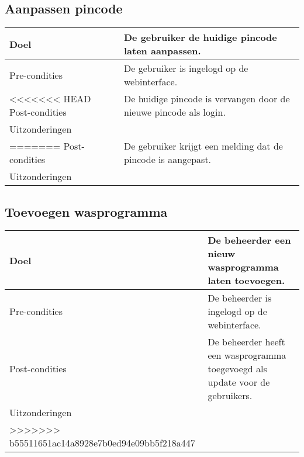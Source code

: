 \subsection{Aanpassen pincode}
\begin{center}
  \begin{tabular}{ | p{4cm} | p{8.5cm} | }    \hline
    Doel & De gebruiker de huidige pincode laten aanpassen. \\ \hline
    Pre-condities & De gebruiker is ingelogd op de webinterface. \\ \hline
<<<<<<< HEAD
    Post-condities & De huidige pincode is vervangen door de nieuwe pincode als login. \\ \hline
    Uitzonderingen &  \\
=======
    Post-condities & De gebruiker krijgt een melding dat de pincode is aangepast. \\ \hline
	Uitzonderingen &  \\
    \hline
  \end{tabular}
\end{center}

\subsection{Toevoegen wasprogramma}
\begin{center}
  \begin{tabular}{ | p{4cm} | p{8.5cm} | }    \hline
    Doel & De beheerder een nieuw wasprogramma laten toevoegen. \\ \hline
    Pre-condities & De beheerder is ingelogd op de webinterface. \\ \hline
    Post-condities & De beheerder heeft een wasprogramma toegevoegd als update voor de gebruikers. \\ \hline
	Uitzonderingen &  \\
>>>>>>> b55511651ac14a8928e7b0ed94e09bb5f218a447
    \hline
  \end{tabular}
\end{center}